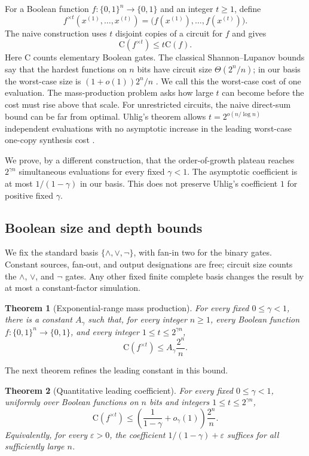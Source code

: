 \documentclass[11pt]{article}
\newtheorem{theorem}{Theorem}[section]
\newcommand{\bits}{\{0,1\}}
\newcommand{\C}{\mathrm{C}}
\begin{document}
For a Boolean function $f:\bits^n\to\bits$ and an integer $t\ge 1$, define
\[
  f^{\times t}(x^{(1)},\ldots,x^{(t)})
  =\bigl(f(x^{(1)}),\ldots,f(x^{(t)})\bigr).
\]
The naive construction uses $t$ disjoint copies of a circuit for $f$ and gives
\[
  \C(f^{\times t})\le t\C(f).
\]
Here $\C$ counts elementary Boolean gates.  The classical
Shannon--Lupanov bounds say that the hardest functions on $n$ bits have
circuit size $\Theta(2^n/n)$; in our basis the worst-case size is
$(1+o(1))2^n/n$ \cite{Shannon1949,Lupanov1958,FrandsenMiltersen2005}.
We call this the worst-case cost of one evaluation.
The mass-production problem asks how large $t$ can become before the cost must
rise above that scale.  For unrestricted circuits, the
naive direct-sum bound can be far from optimal.  Uhlig's theorem allows
$t=2^{o(n/\log n)}$ independent evaluations with no asymptotic increase in
the leading worst-case one-copy synthesis cost
\cite{Uhlig1992,Wegener1987,Kretschmer2023}.

We prove, by a different construction, that the order-of-growth plateau reaches
$2^{\gamma n}$ simultaneous evaluations for every fixed $\gamma<1$.  The
asymptotic coefficient is at most $1/(1-\gamma)$ in our basis.  This does not
preserve Uhlig's coefficient $1$ for positive fixed $\gamma$.

\subsection{Boolean size and depth bounds}

We fix the standard basis $\{\wedge,\vee,\neg\}$, with fan-in two for the
binary gates.  Constant sources, fan-out, and output designations are free;
circuit size counts the $\wedge$, $\vee$, and $\neg$ gates.
Any other fixed finite complete basis changes
the result by at most a constant-factor simulation.

\begin{theorem}[Exponential-range mass production]\label{thm:main}
For every fixed $0\le\gamma<1$, there is a constant $A_\gamma$ such that, for
every integer $n\ge1$, every Boolean function $f:\bits^n\to\bits$, and every
integer $1\le t\le 2^{\gamma n}$,
\[
  \C(f^{\times t})\le A_\gamma\frac{2^n}{n}.
\]
\end{theorem}

The next theorem refines the leading constant in this bound.

\begin{theorem}[Quantitative leading coefficient]\label{thm:coefficient}
For every fixed $0\le\gamma<1$, uniformly over Boolean functions on $n$ bits
and integers $1\le t\le2^{\gamma n}$,
\[
  \C(f^{\times t})
  \le\left(\frac{1}{1-\gamma}+o_\gamma(1)\right)\frac{2^n}{n}.
\]
Equivalently, for every $\varepsilon>0$, the coefficient
$1/(1-\gamma)+\varepsilon$ suffices for all sufficiently large $n$.
\end{theorem}
\end{document}
